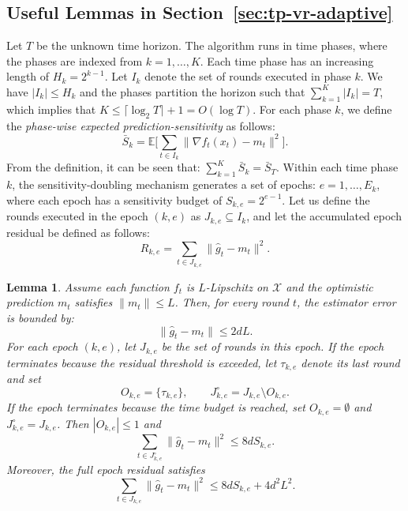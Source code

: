 \documentclass[journal,onecolumn]{IEEEtran}
\newcommand{\cX}{\mathcal{X}}
\theoremstyle{plain}
\newtheorem{lemma}[theorem]{Lemma}
\theoremstyle{definition}
\theoremstyle{remark}
\begin{document}
{\subsection{Useful Lemmas in Section~\ref{sec:tp-vr-adaptive}}

Let $T$ be the unknown time horizon. The algorithm runs in time phases, where the phases are indexed from $k=1, \ldots, K$. Each time phase has an increasing length of $H_{k}=2^{k-1}$. Let $I_{k}$ denote the set of rounds
executed in phase $k$.  We have $|I_{k}|\le H_{k}$ and the phases partition the
horizon such that $\sum_{k=1}^{K}|I_{k}| = T$, which implies that $K \le \lceil\log
_{2}T\rceil+1 = O(\log T)$. For each phase $k$, we define the \emph{phase-wise
expected prediction-sensitivity} as follows:
\begin{equation*}
    \bar S_{k}= \mathbb{E}\bigg[\sum_{t\in I_k}\|\nabla f_{t}(x_{t})-m_{t}\|^{2}\bigg].
\end{equation*}
From the definition, it can be seen that: $\sum_{k=1}^{K}\bar S_{k}= \bar S_{T}$. Within each time phase $k$, the sensitivity-doubling mechanism generates a set of epochs: $e=1,\ldots,E_{k}$, where each epoch has a sensitivity budget of $S_{k,e}=2^{e-1}$. Let us define the rounds executed in the epoch $(k,e)$ as $J_{k,e}\subseteq I_{k}$, and let the accumulated epoch residual be defined as follows:
\begin{equation*}
    R_{k,e}= \sum_{t\in J_{k,e}}\|\hat g_{t}-m_{t}\|^{2}.
\end{equation*}

\begin{lemma}
    \label{lem:oneshot-residual-anytime} Assume each function $f_{t}$ is $L$-Lipschitz
    on $\cX$ and the optimistic prediction $m_{t}$ satisfies $\|m_{t}\|\le L$. Then,
    for every round $t$, the estimator error is bounded by:
    \begin{equation*}
        \|\hat g_{t}-m_{t}\| \le 2dL.
    \end{equation*}
    For each epoch $(k,e)$, let $J_{k,e}$ be the set of rounds in this epoch. If the epoch terminates because the residual threshold is exceeded, let $\tau_{k,e}$ denote its last round and set
\begin{equation*}
    O_{k,e}=\{\tau_{k,e}\},
    \qquad
    J_{k,e}^{\circ}=J_{k,e}\setminus O_{k,e}.
\end{equation*}
If the epoch terminates because the time budget is reached, set $O_{k,e}=\emptyset$ and $J_{k,e}^{\circ}=J_{k,e}$. Then $|O_{k,e}|\le 1$ and
\begin{equation*}
    \sum_{t\in J_{k,e}^{\circ}}\|\hat g_t-m_t\|^2
    \le
    8dS_{k,e}.
\end{equation*}
Moreover, the full epoch residual satisfies
\begin{equation*}
    \sum_{t\in J_{k,e}}\|\hat g_t-m_t\|^2
    \le
    8dS_{k,e}+4d^2L^2.
\end{equation*}
\end{lemma}

}
\end{document}
